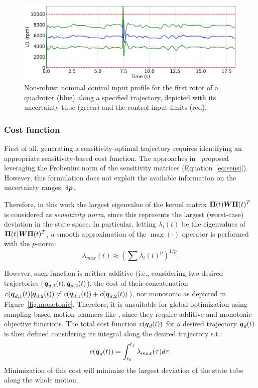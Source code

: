 \begin{figure} [t]
    \centering
    \includegraphics[width=0.8\linewidth]{figures/samp/Invalid_Inputs.png} 
    \caption{Non-robust nominal control input profile for the first rotor of a quadrotor (blue) along a specified trajectory, depicted with its uncertainty tube (green) and the control input limits (red).}%
    \label{fig:invalid_inputs}%
\end{figure}

\subsubsection{Cost function}\label{sec:sensi_cost}

First of all, generating a sensitivity-optimal trajectory requires identifying an appropriate sensitivity-based cost function.
The approaches in~\cite{cPi, cTh} proposed leveraging the Frobenius norm of the sensitivity matrices (Equation~\ref{eq:sensi}).
However, this formulation does not exploit the available information on the uncertainty ranges, $\delta \boldsymbol{p}$.

Therefore, in this work the largest eigenvalue of the kernel matrix $\boldsymbol{\Pi}(t) \boldsymbol{W} \boldsymbol{\Pi}(t)^T$ is considered as \emph{sensitivity norm}, since this represents the largest (worst-case) deviation in the state space. 
In particular, letting $\lambda_i(t)$ be the eigenvalues of $\boldsymbol{\Pi}(t) \boldsymbol{W} \boldsymbol{\Pi}(t)^T$, a smooth approximation of the $\max(\cdot)$ operator is performed with the $p$-norm:
\begin{equation}
    \lambda_{max}(t)\approx \left(\sum \lambda_{i}(t)^p\right)^{1/p}.
\end{equation} 

However, such function is neither additive (i.e., considering two desired trajectories ($\boldsymbol{q}_{d,1}(t), \boldsymbol{q}_{d,2}(t)$), the cost of their concatenation $c(\boldsymbol{q}_{d,1}(t)|\boldsymbol{q}_{d,2}(t)) \neq c(\boldsymbol{q}_{d,1}(t)) + c(\boldsymbol{q}_{d,2}(t))$), nor monotonic as depicted in Figure~\ref{fig:monotonic}.
Therefore, it is unsuitable for global optimization using sampling-based motion planners like \cite{cRRTstar, cSST}, since they require additive and monotonic objective functions.
The total cost function $c(\boldsymbol{q}_d(t))$ for a desired trajectory $\boldsymbol{q}_d(t)$ is then defined considering its integral along the desired trajectory s.t.:
\begin{equation} \label{eq:cost_function}
    c(\boldsymbol{q}_d(t))=\int_{t_{0}}^{t_{f}}\lambda_{max}(\tau)d\tau.
\end{equation}
Minimization of this cost will minimize the largest deviation of the state tube along the whole motion.

